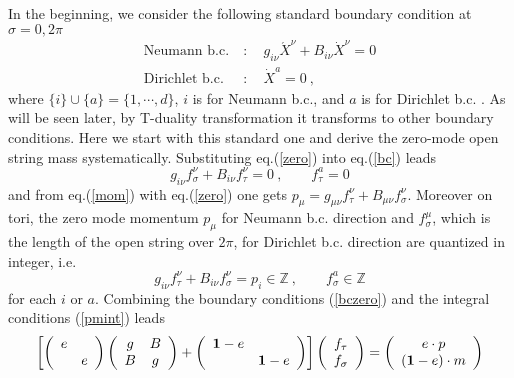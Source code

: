 \documentclass[a4paper,12pt]{article}
\newcommand{\Z}{{\mathbb{Z}}}
\def \Xd{{\dot X}}
\def \Xa{{\acute X}}
\def \1{{\bf 1}}
\begin{document}
In the beginning, we consider the following standard boundary condition 
at $\sigma=0, 2\pi$  
\begin{equation}
 \begin{array}{rl}
 \mbox{Neumann b.c.}\ &: \quad g_{i\nu}\Xa^\nu+B_{i\nu}\Xd^\nu=0\\
 \mbox{Dirichlet b.c.}\ &: \quad \Xd^a=0 \ , 
 \end{array}
 \label{bc}
\end{equation}
where $\{i\}\cup\{a\}=\{1,\cdots,d\}$, $i$ is for Neumann b.c., and 
$a$ is for Dirichlet b.c. . As will be seen later, 
by T-duality transformation it transforms to other boundary conditions. 
Here we start with this standard one and derive the zero-mode 
open string mass systematically. 
Substituting eq.(\ref{zero}) into eq.(\ref{bc}) leads 
\begin{equation}
 g_{i\nu}f_\sigma^\nu+B_{i\nu}f_\tau^\nu=0\ ,\qquad f_\tau^a=0
 \label{bczero}
\end{equation}
and from eq.(\ref{mom}) with eq.(\ref{zero}) one gets 
$p_\mu=g_{\mu\nu}f_\tau^\nu+B_{\mu\nu}f_\sigma^\nu$. 
Moreover on tori, the zero mode momentum 
$p_\mu$ for Neumann b.c. direction and 
$f_\sigma^\mu$, which is the length of the open string over $2\pi$, 
for Dirichlet b.c. direction are quantized in integer, i.e. 
\begin{equation}
 g_{i\nu}f_\tau^\nu+B_{i\nu}f_\sigma^\nu = p_i \in \Z\ ,
 \qquad f_\sigma^a\in\Z \label{pmint}
\end{equation}
for each $i$ or $a$. 
Combining the boundary conditions (\ref{bczero}) 
and the integral conditions (\ref{pmint}) leads 
\begin{equation}
 \left[ \left(
 \begin{array}{cc}
  e & \\
    & e 
 \end{array}\right)
 \left(
 \begin{array}{cc}
  g & B\\
  B & g 
 \end{array}\right)
 +\left(
 \begin{array}{cc}
  \1-e & \\
    & \1-e 
 \end{array}\right)
 \right] 
  \left(
 \begin{array}{c}
  f_\tau \\
  f_\sigma 
 \end{array}\right)  
 =
 \left(
 \begin{array}{c}
  e\cdot p\\
  (\1-e)\cdot m 
 \end{array}\right)
 \label{M}
\end{equation}
\end{document}
